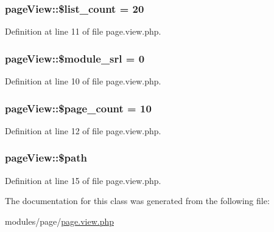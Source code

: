 \subsubsection[{\$list\+\_\+count}]{\setlength{\rightskip}{0pt plus 5cm}page\+View\+::\$list\+\_\+count = 20}\label{classpageView_a7010bb0d08c9f9f9dc5a44aeaaa2bb15}


Definition at line 11 of file page.\+view.\+php.

\hypertarget{classpageView_add2f52835c01c951adb6b79453417cdf}{}
\subsubsection[{\$module\+\_\+srl}]{\setlength{\rightskip}{0pt plus 5cm}page\+View\+::\$module\+\_\+srl = 0}\label{classpageView_add2f52835c01c951adb6b79453417cdf}


Definition at line 10 of file page.\+view.\+php.

\hypertarget{classpageView_a2f62b83f9128e0ccbec4a02dbb46962a}{}
\subsubsection[{\$page\+\_\+count}]{\setlength{\rightskip}{0pt plus 5cm}page\+View\+::\$page\+\_\+count = 10}\label{classpageView_a2f62b83f9128e0ccbec4a02dbb46962a}


Definition at line 12 of file page.\+view.\+php.

\hypertarget{classpageView_ac629942e1cd4eacbca09412968f4c8e3}{}
\subsubsection[{\$path}]{\setlength{\rightskip}{0pt plus 5cm}page\+View\+::\$path}\label{classpageView_ac629942e1cd4eacbca09412968f4c8e3}


Definition at line 15 of file page.\+view.\+php.



The documentation for this class was generated from the following file\+:\begin{DoxyCompactItemize}
\item 
modules/page/\hyperlink{page_8view_8php}{page.\+view.\+php}\end{DoxyCompactItemize}

